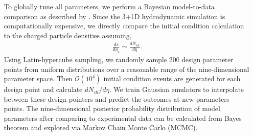\documentclass[3p,times,twocolumn]{elsarticle}
\begin{document}
To globally tune all parameters, we perform a Bayesian model-to-data comparison as described by \cite{Bernhard:2015hxa}.
Since the 3+1D hydrodynamic simulation is computationally expensive, we directly compare the initial condition calculation to the charged particle densities assuming,
\begin{eqnarray}
\frac{ds}{d\eta_s} \sim \frac{dN_{ch}}{d\eta}.
\end{eqnarray}
Using Latin-hypercube sampling, we randomly sample 200 design parameter points from uniform distributions over a reasonable range of the nine-dimensional parameter space. Then $\mathcal{O}(10^4)$ initial condition events are generated for each design point and calculate $dN_{ch}/d\eta$.
We train Gaussian emulators to interpolate between these design pointers and predict the outcomes at new parameters points.
The nine-dimensional posterior probability distribution of model parameters after comparing to experimental data can be calculated from Bayes theorem and explored via Markov Chain Monte Carlo (MCMC).
\end{document}
